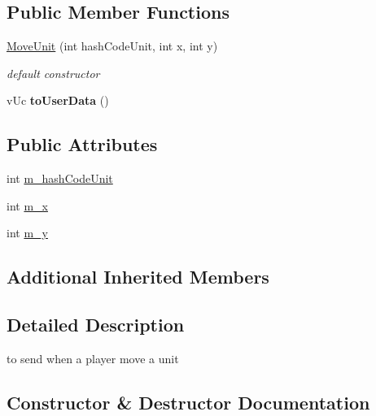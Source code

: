\subsection*{Public Member Functions}
\begin{DoxyCompactItemize}
\item 
\hyperlink{class_network_1_1_messages_1_1_move_unit_ae92bd99ece70dfb3d27e03405e9996f9}{Move\+Unit} (int hash\+Code\+Unit, int x, int y)
\begin{DoxyCompactList}\small\item\em default constructor \end{DoxyCompactList}\item 
\mbox{\label{class_network_1_1_messages_1_1_move_unit_af7c2f8b322eff2d9d4b463935df2b5ad}} 
v\+Uc {\bfseries to\+User\+Data} ()
\end{DoxyCompactItemize}
\subsection*{Public Attributes}
\begin{DoxyCompactItemize}
\item 
int \hyperlink{class_network_1_1_messages_1_1_move_unit_a0bce149dc857da3f91dd1efbcc4f874f}{m\+\_\+hash\+Code\+Unit}
\item 
int \hyperlink{class_network_1_1_messages_1_1_move_unit_a26e5a301d6dece987de0a9e327c41906}{m\+\_\+x}
\item 
int \hyperlink{class_network_1_1_messages_1_1_move_unit_a11b0de19e2d287594045a97a70b79f4b}{m\+\_\+y}
\end{DoxyCompactItemize}
\subsection*{Additional Inherited Members}


\subsection{Detailed Description}
to send when a player move a unit 

\subsection{Constructor \& Destructor Documentation}
\mbox{\label{class_network_1_1_messages_1_1_move_unit_ae92bd99ece70dfb3d27e03405e9996f9}} 
